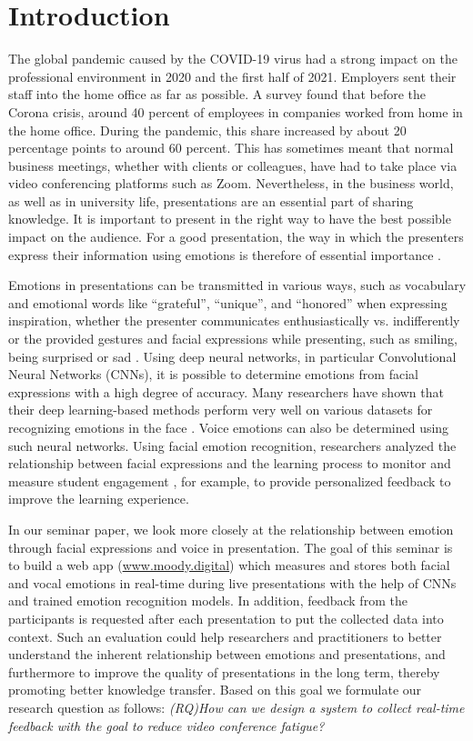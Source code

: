 \section{Introduction}
\label{sec:intro}
The global pandemic caused by the COVID-19 virus had a strong impact on the professional environment in 2020 and the first half of 2021. Employers sent their staff into the home office as far as possible. A survey found that before the Corona crisis, around 40 percent of employees in companies worked from home in the home office. During the pandemic, this share increased by about 20 percentage points to around 60 percent. This has sometimes meant that normal business meetings, whether with clients or colleagues, have had to take place via video conferencing platforms such as Zoom. Nevertheless, in the business world, as well as in university life, presentations are an essential part of sharing knowledge. It is important to present in the right way to have the best possible impact on the audience. For a good presentation, the way in which the presenters express their information using emotions is therefore of essential importance \cite{derrico_tracking_2019}.

Emotions in presentations can be transmitted in various ways, such as vocabulary and emotional words like ``grateful'', ``unique'', and ``honored'' when expressing inspiration, whether the presenter communicates enthusiastically vs. indifferently or the provided gestures and facial expressions while presenting, such as smiling, being surprised or sad \cite{zeng_emoco_2019, rosler_reducing_2021}. Using deep neural networks, in particular Convolutional Neural Networks (CNNs), it is possible to determine emotions from facial expressions with a high degree of accuracy. Many researchers have shown that their deep learning-based methods perform very well on various datasets for recognizing emotions in the face \cite{ko_brief_2018}. Voice emotions can also be determined using such neural networks. Using facial emotion recognition, researchers analyzed the relationship between facial expressions and the learning process to monitor and measure student engagement \cite{de_carolis_engaged_2019}, for example, to provide personalized feedback to improve the learning experience. 

In our seminar paper, we look more closely at the relationship between emotion through facial expressions and voice in presentation. The goal of this seminar is to build a web app (\url{www.moody.digital}) which measures and stores both facial and vocal emotions in real-time during live presentations with the help of CNNs and trained emotion recognition models. In addition, feedback from the participants is requested after each presentation to put the collected data into context. Such an evaluation could help researchers and practitioners to better understand the inherent relationship between emotions and presentations, and furthermore to improve the quality of presentations in the long term, thereby promoting better knowledge transfer. Based on this goal we formulate our research question as follows:
\vspace{1mm}
\newline
\emph{(RQ)\quad How can we design a system to collect real-time feedback with the goal to reduce video conference fatigue?}
